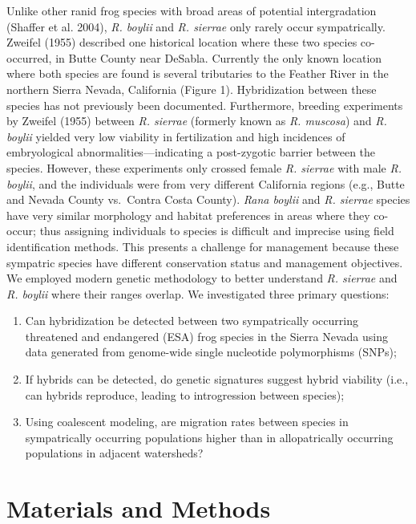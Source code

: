 \documentclass[twoside,12pt,final]{ucthesis-CA2012}
\providecommand{\tightlist}{%
  \setlength{\itemsep}{0pt}\setlength{\parskip}{0pt}}
\begin{document}
\begin{ucmainmatter}
Unlike other ranid frog species with broad areas of potential
intergradation (Shaffer et al. 2004), \emph{R. boylii} and \emph{R.
sierrae} only rarely occur sympatrically. Zweifel (1955) described one
historical location where these two species co-occurred, in Butte County
near DeSabla. Currently the only known location where both species are
found is several tributaries to the Feather River in the northern Sierra
Nevada, California (Figure 1). Hybridization between these species has
not previously been documented. Furthermore, breeding experiments by
Zweifel (1955) between \emph{R. sierrae} (formerly known as \emph{R.
muscosa}) and \emph{R. boylii} yielded very low viability in
fertilization and high incidences of embryological
abnormalities---indicating a post-zygotic barrier between the species.
However, these experiments only crossed female \emph{R. sierrae} with
male \emph{R. boylii}, and the individuals were from very different
California regions (e.g., Butte and Nevada County vs.~Contra Costa
County). \emph{Rana boylii} and \emph{R. sierrae} species have very
similar morphology and habitat preferences in areas where they co-occur;
thus assigning individuals to species is difficult and imprecise using
field identification methods. This presents a challenge for management
because these sympatric species have different conservation status and
management objectives. We employed modern genetic methodology to better
understand \emph{R. sierrae} and \emph{R. boylii} where their ranges
overlap. We investigated three primary questions:
\begin{enumerate}
\def\labelenumi{\arabic{enumi}.}
\tightlist
\item
  Can hybridization be detected between two sympatrically occurring
  threatened and endangered (ESA) frog species in the Sierra Nevada
  using data generated from genome-wide single nucleotide polymorphisms
  (SNPs);
\item
  If hybrids can be detected, do genetic signatures suggest hybrid
  viability (i.e., can hybrids reproduce, leading to introgression
  between species);
\item
  Using coalescent modeling, are migration rates between species in
  sympatrically occurring populations higher than in allopatrically
  occurring populations in adjacent watersheds?
\end{enumerate}
\hypertarget{materials-and-methods}{%
\section{Materials and Methods}\label{materials-and-methods}}


\end{ucmainmatter}
\end{document}
